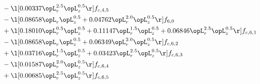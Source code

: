 \begin{alignat}{2}
& - \l[  0.00337 \opL_r^{2.5} \opL_z^{0.5}  \r] f_{c,4,5} \nonumber \\ 
& - \l[  0.08658 \opL_r \opL_z^{0.5} +  0.04762 \opL_r^{2.0} \opL_z^{0.5}  \r] f_{6,0} \nonumber \\ 
& + \l[  0.18010 \opL_r^{0.5} \opL_z^{0.5} +  0.11147 \opL_r^{1.5} \opL_z^{0.5} +  0.06846 \opL_r^{2.5} \opL_z^{0.5}  \r] f_{c,6,1} \nonumber \\ 
& - \l[  0.08658 \opL_r \opL_z^{0.5} +  0.06349 \opL_r^{2.0} \opL_z^{0.5}  \r] f_{c,6,2} \nonumber \\ 
& + \l[  0.03716 \opL_r^{1.5} \opL_z^{0.5} +  0.03423 \opL_r^{2.5} \opL_z^{0.5}  \r] f_{c,6,3} \nonumber \\ 
& - \l[  0.01587 \opL_r^{2.0} \opL_z^{0.5}  \r] f_{c,6,4} \nonumber \\ 
& + \l[  0.00685 \opL_r^{2.5} \opL_z^{0.5}  \r] f_{c,6,5} \nonumber \\ 
\end{alignat} 


